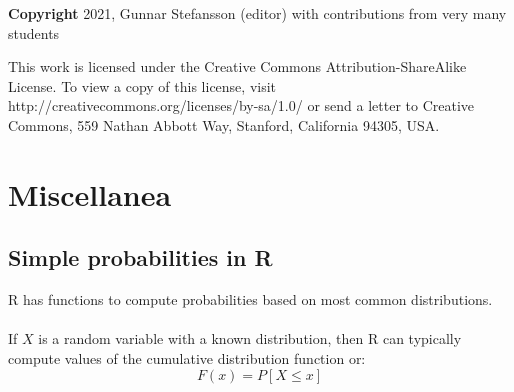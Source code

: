 \documentclass[12pt,a4paper]{article}
\theoremstyle{regla}
\theoremstyle{remark}
\theoremstyle{definition}
\theoremstyle{nonumberbreak}
\begin{document}
{\bf Copyright}
2021, Gunnar Stefansson (editor) with contributions from very many students

This work is licensed under the Creative Commons
Attribution-ShareAlike License. To view a copy of this license, visit
http://creativecommons.org/licenses/by-sa/1.0/ or send a letter to
Creative Commons, 559 Nathan Abbott Way, Stanford, California 94305,
USA.
\clearpage
\section{Miscellanea}
\subsection{Simple probabilities in R}
\begin{fbox}
\begin{minipage}{0.97\textwidth}
R has functions to compute probabilities based on most common distributions.\\\\

If $X$ is a random variable with a known distribution, then R can typically compute values of the cumulative distribution function or:
$$F(x)=P[X \leq x]$$

\end{minipage}
\end{fbox}
\end{document}
